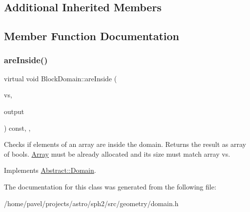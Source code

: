 \subsection*{Additional Inherited Members}


\subsection{Member Function Documentation}
\hypertarget{classBlockDomain_a2dba56e9bbecdc5954147accfdcf331b}{}\label{classBlockDomain_a2dba56e9bbecdc5954147accfdcf331b} 
\subsubsection{\texorpdfstring{are\+Inside()}{areInside()}}
{\footnotesize\ttfamily virtual void Block\+Domain\+::are\+Inside (\begin{DoxyParamCaption}\item[{const \hyperlink{classArrayView}{Array\+View}$<$ \hyperlink{classBasicVector}{Vector} $>$}]{vs,  }\item[{\hyperlink{classArrayView}{Array\+View}$<$ bool $>$}]{output }\end{DoxyParamCaption}) const\hspace{0.3cm}{\ttfamily [inline]}, {\ttfamily [override]}, {\ttfamily [virtual]}}

Checks if elements of an array are inside the domain. Returns the result as array of bools. \hyperlink{classArray}{Array} must be already allocated and its size must match array vs. 

Implements \hyperlink{classAbstract_1_1Domain_a48ecb4ac3dab5f5a5e2de7b8e8218317}{Abstract\+::\+Domain}.



The documentation for this class was generated from the following file\+:\begin{DoxyCompactItemize}
\item 
/home/pavel/projects/astro/sph2/src/geometry/domain.\+h\end{DoxyCompactItemize}
